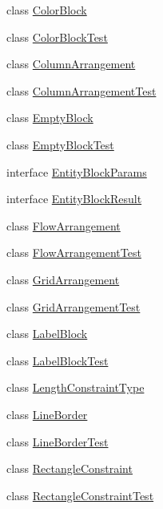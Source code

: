 \begin{DoxyCompactItemize}
\item 
class \mbox{\hyperlink{classorg_1_1jfree_1_1chart_1_1block_1_1_color_block}{Color\+Block}}
\item 
class \mbox{\hyperlink{classorg_1_1jfree_1_1chart_1_1block_1_1_color_block_test}{Color\+Block\+Test}}
\item 
class \mbox{\hyperlink{classorg_1_1jfree_1_1chart_1_1block_1_1_column_arrangement}{Column\+Arrangement}}
\item 
class \mbox{\hyperlink{classorg_1_1jfree_1_1chart_1_1block_1_1_column_arrangement_test}{Column\+Arrangement\+Test}}
\item 
class \mbox{\hyperlink{classorg_1_1jfree_1_1chart_1_1block_1_1_empty_block}{Empty\+Block}}
\item 
class \mbox{\hyperlink{classorg_1_1jfree_1_1chart_1_1block_1_1_empty_block_test}{Empty\+Block\+Test}}
\item 
interface \mbox{\hyperlink{interfaceorg_1_1jfree_1_1chart_1_1block_1_1_entity_block_params}{Entity\+Block\+Params}}
\item 
interface \mbox{\hyperlink{interfaceorg_1_1jfree_1_1chart_1_1block_1_1_entity_block_result}{Entity\+Block\+Result}}
\item 
class \mbox{\hyperlink{classorg_1_1jfree_1_1chart_1_1block_1_1_flow_arrangement}{Flow\+Arrangement}}
\item 
class \mbox{\hyperlink{classorg_1_1jfree_1_1chart_1_1block_1_1_flow_arrangement_test}{Flow\+Arrangement\+Test}}
\item 
class \mbox{\hyperlink{classorg_1_1jfree_1_1chart_1_1block_1_1_grid_arrangement}{Grid\+Arrangement}}
\item 
class \mbox{\hyperlink{classorg_1_1jfree_1_1chart_1_1block_1_1_grid_arrangement_test}{Grid\+Arrangement\+Test}}
\item 
class \mbox{\hyperlink{classorg_1_1jfree_1_1chart_1_1block_1_1_label_block}{Label\+Block}}
\item 
class \mbox{\hyperlink{classorg_1_1jfree_1_1chart_1_1block_1_1_label_block_test}{Label\+Block\+Test}}
\item 
class \mbox{\hyperlink{classorg_1_1jfree_1_1chart_1_1block_1_1_length_constraint_type}{Length\+Constraint\+Type}}
\item 
class \mbox{\hyperlink{classorg_1_1jfree_1_1chart_1_1block_1_1_line_border}{Line\+Border}}
\item 
class \mbox{\hyperlink{classorg_1_1jfree_1_1chart_1_1block_1_1_line_border_test}{Line\+Border\+Test}}
\item 
class \mbox{\hyperlink{classorg_1_1jfree_1_1chart_1_1block_1_1_rectangle_constraint}{Rectangle\+Constraint}}
\item 
class \mbox{\hyperlink{classorg_1_1jfree_1_1chart_1_1block_1_1_rectangle_constraint_test}{Rectangle\+Constraint\+Test}}
\end{DoxyCompactItemize}

